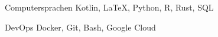 

\begin{cvpairs}

  
\cvpair
    {Computersprachen} %
    {Kotlin, LaTeX, Python, R, Rust, SQL} %


\cvpair
    {DevOps} %
    {Docker, Git, Bash, Google Cloud} %

\end{cvpairs}
